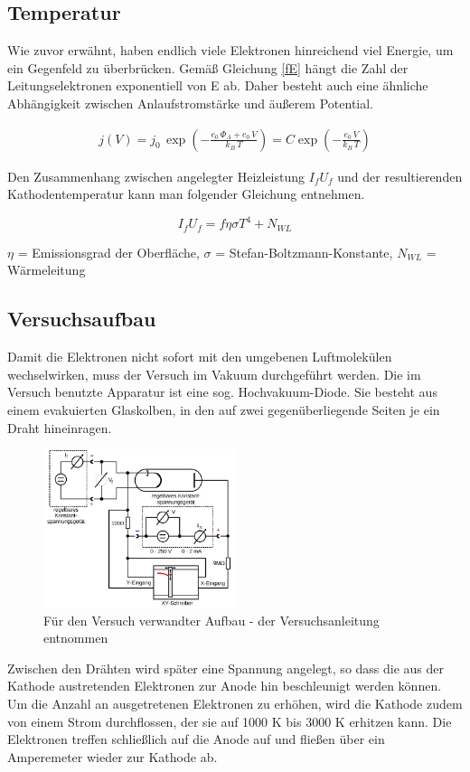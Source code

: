\subsection{Temperatur}
Wie zuvor erwähnt, haben endlich viele Elektronen hinreichend viel Energie, um ein Gegenfeld zu überbrücken. Gemäß Gleichung \eqref{fE}
hängt die Zahl der Leitungselektronen exponentiell von E ab. Daher besteht auch eine ähnliche Abhängigkeit zwischen Anlaufstromstärke und
äußerem Potential.

\begin{align}
 j(V) = j_0 \, \exp \left( -\frac{e_0\, \Phi_A + e_0 \, V}{k_B \, T} \right) = C \exp \left(- \frac{e_0 \, V}{k_B \, T} \right)
 \label{eqtemp}
\end{align}

Den Zusammenhang zwischen angelegter Heizleistung $I_f U_f$ und der resultierenden Kathodentemperatur kann man folgender Gleichung entnehmen.

\begin{formel}
\begin{equation}
I_f U_f = f \eta \sigma T^4 + N_{WL}
\label{eq_temperatur}
\end{equation}
\caption*{\small{$\eta$ = Emissionsgrad der Oberfläche, $\sigma$ =  Stefan-Boltzmann-Konstante, $N_{WL}$ = Wärmeleitung}}
\end{formel}

\subsection{Versuchsaufbau}
Damit die Elektronen nicht sofort mit den umgebenen Luftmolekülen wechselwirken, muss der Versuch im Vakuum durchgeführt werden. Die im Versuch benutzte Apparatur ist eine sog. Hochvakuum-Diode. Sie besteht aus einem evakuierten Glaskolben, in den auf zwei gegenüberliegende Seiten je ein Draht hineinragen.
\begin{figure}[H]
\includegraphics[width=0.5\textwidth]{pics/aufbau1.jpg}
\caption{Für den Versuch verwandter Aufbau - der Versuchsanleitung entnommen}
\end{figure}
Zwischen den Drähten wird später eine Spannung angelegt, so dass die aus der Kathode austretenden Elektronen zur Anode hin beschleunigt werden können. Um die Anzahl an ausgetretenen Elektronen zu erhöhen, wird die Kathode zudem von einem Strom durchflossen, der sie auf 1000 K bis 3000 K erhitzen kann. Die Elektronen treffen schließlich auf die Anode auf und fließen über ein Amperemeter wieder zur Kathode ab.

